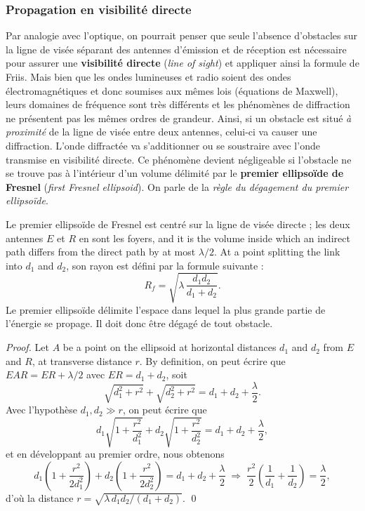 \subsubsection{Propagation en visibilité directe}

Par analogie avec l'optique, on pourrait penser que seule l'absence d'obstacles
sur la ligne de visée séparant des antennes d'émission et de réception est
nécessaire pour assurer une \textbf{visibilité directe} (\textit{line of sight})
et appliquer ainsi la formule de Friis. Mais bien que les ondes lumineuses et
radio soient des ondes électromagnétiques et donc soumises aux mêmes lois
(équations de Maxwell), leurs domaines de fréquence sont très différents et les
phénomènes de diffraction ne présentent pas les mêmes ordres de grandeur. Ainsi,
si un obstacle est situé \emph{à proximité} de la ligne de visée entre deux
antennes, celui-ci va causer une diffraction. L'onde diffractée va
s'additionner ou se soustraire avec l'onde transmise en visibilité directe. Ce
phénomène devient négligeable si l'obstacle ne se trouve pas à l'intérieur d'un
volume délimité par le \textbf{premier ellipsoïde de Fresnel}
(\textit{first Fresnel ellipsoid}). On parle de la \emph{règle du dégagement du
premier ellipsoïde}.

\begin{definition}
  Le premier ellipsoïde de Fresnel est centré sur la ligne de visée directe ;
  les deux antennes $E$ et $R$ en sont les foyers, and it is the volume inside
  which an indirect path differs from the direct path by at most $\lambda/2$.
  At a point splitting the link into $d_1$ and $d_2$, son rayon est défini par
  la formule suivante :
  \[ R_f = \sqrt{\lambda\, \frac{d_1 d_2}{d_1 + d_2}}. \]
  Le premier ellipsoïde délimite l'espace dans lequel la plus grande partie de
  l'énergie se propage. Il doit donc être dégagé de tout obstacle.
\end{definition}

\begin{proof}
  Let $A$ be a point on the ellipsoid at horizontal distances $d_1$ and $d_2$
  from $E$ and $R$, at transverse distance $r$. By definition, on peut écrire
  que $EAR = ER + \lambda/2$ avec $ER = d_1 + d_2$, soit
  \[ \sqrt{d_1^2 + r^2} + \sqrt{d_2^2 + r^2} = d_1 + d_2 + \frac{\lambda}{2}. \]
  Avec l'hypothèse $d_1, d_2 \gg r$, on peut écrire que
  \[ d_1 \sqrt{1 + \frac{r^2}{d_1^2}} + d_2 \sqrt{1 + \frac{r^2}{d_2^2}}
     = d_1 + d_2 + \frac{\lambda}{2}, \]
  et en développant au premier ordre, nous obtenons
  \[ d_1\left(1 + \frac{r^2}{2 d_1^2}\right) + d_2\left(1 + \frac{r^2}{2 d_2^2}\right)
     = d_1 + d_2 + \frac{\lambda}{2}
     \;\Longrightarrow\;
     \frac{r^2}{2}\left(\frac{1}{d_1} + \frac{1}{d_2}\right) = \frac{\lambda}{2}, \]
  d'où la distance $r = \sqrt{\lambda\, d_1 d_2/(d_1+d_2)}$. \qed
\end{proof}

